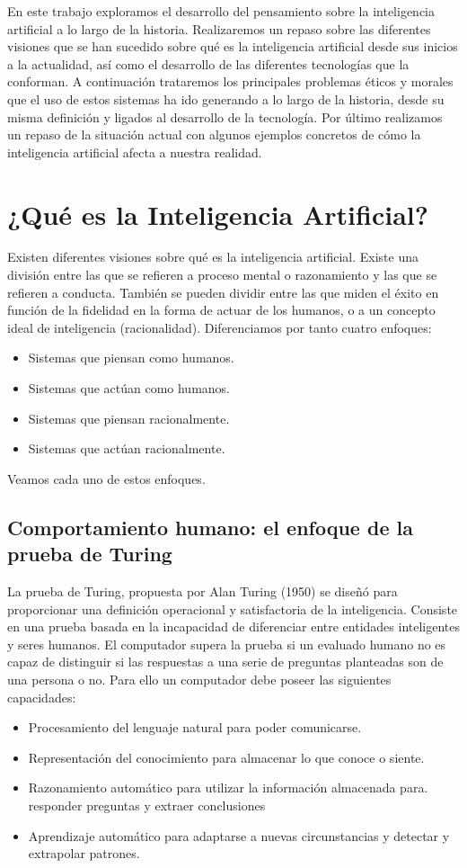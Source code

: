 \documentclass[12pt,a4paper]{article}
\begin{document}
En este trabajo exploramos el desarrollo del pensamiento sobre la inteligencia artificial a lo largo de la historia. Realizaremos un repaso sobre las diferentes visiones que se han sucedido sobre qué es la inteligencia artificial desde sus inicios a la actualidad, así como el desarrollo de las diferentes tecnologías que la conforman. A continuación trataremos los principales problemas éticos y morales que el uso de estos sistemas ha ido generando a lo largo de la historia, desde su misma definición y ligados al desarrollo de la tecnología. Por último realizamos un repaso de la situación actual con algunos ejemplos concretos de cómo la inteligencia artificial afecta a nuestra realidad.

\section{¿Qué es la Inteligencia Artificial?}

Existen diferentes visiones sobre qué es la inteligencia artificial. Existe una división entre las que se refieren a proceso mental o razonamiento y las que se refieren a conducta. También se pueden dividir entre las que miden el éxito en función de la fidelidad en la forma de actuar de los humanos, o a un concepto ideal de inteligencia (racionalidad). Diferenciamos por tanto cuatro enfoques:

\begin{itemize}
\item Sistemas que piensan como humanos.
\item Sistemas que actúan como humanos.
\item Sistemas que piensan racionalmente.
\item Sistemas que actúan racionalmente.
\end{itemize}
Veamos cada uno de estos enfoques.

\subsection{Comportamiento humano: el enfoque de la prueba de Turing}

La prueba de Turing, propuesta por Alan Turing (1950)\cite{Turing} se diseñó para proporcionar una definición operacional y satisfactoria de la inteligencia. Consiste en una prueba basada en la incapacidad de diferenciar entre entidades inteligentes y seres humanos. El computador supera la prueba si un evaluado humano no es capaz de distinguir si las respuestas a una serie de preguntas planteadas son de una persona o no. Para ello un computador debe poseer las siguientes capacidades:
\begin{itemize}
\item Procesamiento del lenguaje natural para poder comunicarse.
\item Representación del conocimiento para almacenar lo que conoce o siente.
\item Razonamiento automático para utilizar la información almacenada para. responder preguntas y extraer conclusiones
\item Aprendizaje automático para adaptarse a nuevas circunstancias y detectar y extrapolar patrones.
\end{itemize}
\end{document}
